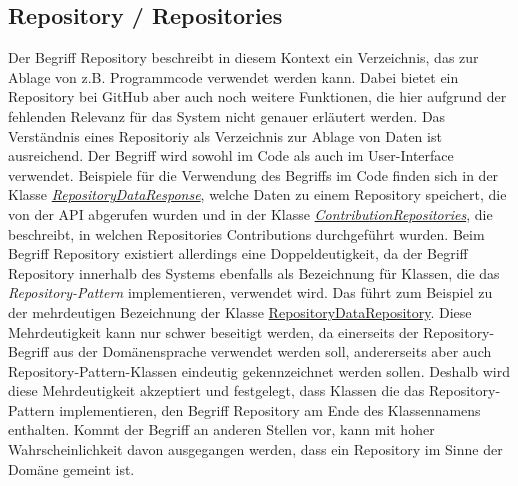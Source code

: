 \subsection*{Repository / Repositories}
Der Begriff Repository beschreibt in diesem Kontext ein Verzeichnis, das zur Ablage von z.B. Programmcode verwendet werden kann.
Dabei bietet ein Repository bei GitHub aber auch noch weitere Funktionen, die hier aufgrund der fehlenden Relevanz für das System nicht genauer erläutert werden.
Das Verständnis eines Repositoriy als Verzeichnis zur Ablage von Daten ist ausreichend.
Der Begriff wird sowohl im Code als auch im User-Interface verwendet.
Beispiele für die Verwendung des Begriffs im Code finden sich in der Klasse \href{https://github.com/lukaspanni/OpenSourceStats/blob/main/app/src/main/java/de/lukaspanni/opensourcestats/data/RepositoryDataResponse.java}{\textit{RepositoryDataResponse}}, welche Daten zu einem Repository speichert, die von der API abgerufen wurden und in der Klasse \href{https://github.com/lukaspanni/OpenSourceStats/blob/main/app/src/main/java/de/lukaspanni/opensourcestats/data/ContributionRepositories.java}{\textit{ContributionRepositories}}, die beschreibt, in welchen Repositories Contributions durchgeführt wurden.
\newline
Beim Begriff Repository existiert allerdings eine Doppeldeutigkeit, da der Begriff Repository innerhalb des Systems ebenfalls als Bezeichnung für Klassen, die das \textit{Repository-Pattern} implementieren, verwendet wird.
Das führt zum Beispiel zu der mehrdeutigen Bezeichnung der Klasse \href{https://github.com/lukaspanni/OpenSourceStats/blob/main/app/src/main/java/de/lukaspanni/opensourcestats/repository/RepositoryDataRepository.java}{RepositoryDataRepository}.
Diese Mehrdeutigkeit kann nur schwer beseitigt werden, da einerseits der Repository-Begriff aus der Domänensprache verwendet werden soll, andererseits aber auch Repository-Pattern-Klassen eindeutig gekennzeichnet werden sollen.
Deshalb wird diese Mehrdeutigkeit akzeptiert und festgelegt, dass Klassen die das Repository-Pattern implementieren, den Begriff Repository am Ende des Klassennamens enthalten.
Kommt der Begriff an anderen Stellen vor, kann mit hoher Wahrscheinlichkeit davon ausgegangen werden, dass ein Repository im Sinne der Domäne gemeint ist.

